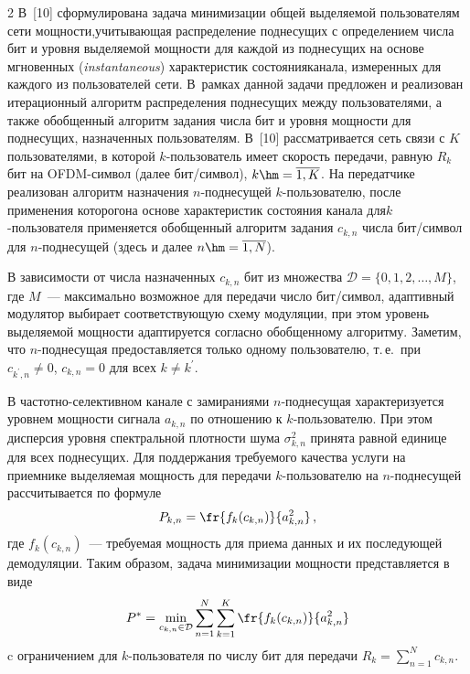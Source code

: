 \begin{multicols}{2}
  В~[10] сформулирована задача минимизации общей выделяемой пользователям сети 
мощ\-ности,\linebreak учитывающая распределение поднесущих с определением числа бит и уровня 
выделяемой мощ\-ности для каждой из поднесущих на основе мгновенных 
(\textit{instantaneous}) характеристик состояния\linebreak канала, измеренных для каждого из 
пользователей сети. В~рамках данной задачи предложен и реализован итерационный 
алгоритм распределения поднесущих между пользователями, а также обобщенный 
алгоритм задания числа бит и уровня мощ\-ности для поднесущих, назначенных 
пользователям. В~[10] рассматривается сеть связи с $K$ пользователями, в которой 
  $k$-поль\-зо\-ва\-тель имеет скорость передачи, равную $R_k$ бит на OFDM-сим\-вол 
(далее бит/символ), $k\hm=\overline{1,K}$. На передатчике реализован алгоритм 
назначения $n$-под\-не\-су\-щей $k$-поль\-зо\-ва\-те\-лю, после применения которого\linebreak на 
основе характеристик состояния канала для\linebreak $k$-поль\-зо\-ва\-те\-ля применяется 
обобщенный алгоритм задания $c_{k,n}$ чис\-ла бит/символ для $n$-под\-не\-су\-щей 
(здесь и далее $n\hm=\overline{1,N}$).
  
  В зависимости от числа назначенных $c_{k,n}$ бит из множества 
$\mathcal{D}=\{0,1,2,\ldots ,M\}$, где $M$~--- максимально возможное для передачи 
число бит/символ, адаптивный модулятор выбирает соответствующую схему модуляции, 
при этом уровень выделяемой мощности адаптируется согласно обобщенному алгоритму. 
Заметим, что $n$-поднесущая предоставляется только одному пользователю, т.\,е.\ при 
$c_{k^\prime,n}\not=0$, $c_{k,n}=0$ для всех $k\not=k^\prime$.
  
  В частотно-селективном канале с замираниями $n$-поднесущая характеризуется 
уровнем мощ\-ности сигнала $a_{k,n}$ по отношению к $k$-пользователю. При этом 
дисперсия уровня спектральной плот\-ности шума $\sigma_{k,n}^2$ принята равной 
единице для всех поднесущих. Для поддержания требуемого качества услуги на 
приемнике выделяемая мощность для передачи $k$-пользователю на $n$-поднесущей 
рассчитывается по формуле 
$$
P_{k,n}=\fr{f_k(c_{k,n})}{a_{k,n}^2}\,,
$$ 
где $f_k(c_{k,n})$~--- 
требуемая мощность для приема данных и их последующей демодуляции. Таким образом, 
задача минимизации мощности представляется в виде 
$$
P^*=\min\limits_{c_{k,n}\in\mathcal{D}}\sum\limits_{n=1}^N \sum\limits_{k=1}^K 
\fr{f_k(c_{k,n})}{a_{k,n}^2}
$$ 
c ограничением для $k$-поль\-зо\-ва\-те\-ля по числу бит для передачи 
$R_k=\sum\limits_{n=1}^N c_{k,n}$.
  

\end{multicols}

